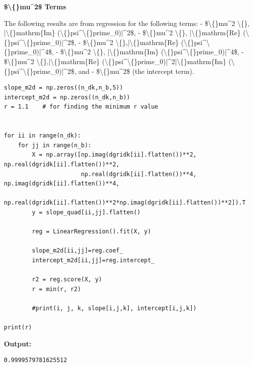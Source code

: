 \documentclass{article}
\begin{document}
\textbf{\$\textbackslash\{\}mu\textasciicircum{}2\$ Terms}

The following results are from regression for the following terms: 
 - \$\textbackslash\{\}mu\textasciicircum{}2 \textbackslash\{\}, |\textbackslash\{\}mathrm\{Im\} (\textbackslash\{\}psi\textasciicircum{}\textbackslash\{\}prime\_0)|\textasciicircum{}2\$, 
 - \$\textbackslash\{\}mu\textasciicircum{}2 \textbackslash\{\}, |\textbackslash\{\}mathrm\{Re\} (\textbackslash\{\}psi\textasciicircum{}\textbackslash\{\}prime\_0)|\textasciicircum{}2\$, 
 - \$\textbackslash\{\}mu\textasciicircum{}2 \textbackslash\{\},|\textbackslash\{\}mathrm\{Re\} (\textbackslash\{\}psi\textasciicircum{}\textbackslash\{\}prime\_0)|\textasciicircum{}4\$,
 - \$\textbackslash\{\}mu\textasciicircum{}2 \textbackslash\{\}, |\textbackslash\{\}mathrm\{Im\} (\textbackslash\{\}psi\textasciicircum{}\textbackslash\{\}prime\_0)|\textasciicircum{}4\$,
 - \$\textbackslash\{\}mu\textasciicircum{}2 \textbackslash\{\},|\textbackslash\{\}mathrm\{Re\} (\textbackslash\{\}psi\textasciicircum{}\textbackslash\{\}prime\_0)|\textasciicircum{}2|\textbackslash\{\}mathrm\{Im\} (\textbackslash\{\}psi\textasciicircum{}\textbackslash\{\}prime\_0)|\textasciicircum{}2\$, and
 - \$\textbackslash\{\}mu\textasciicircum{}2\$ (the intercept term).

\begin{lstlisting}
slope_m2d = np.zeros((n_dk,n_b,5))
intercept_m2d = np.zeros((n_dk,n_b))
r = 1.1    # for finding the minimum r value


for ii in range(n_dk):
    for jj in range(n_b):
        X = np.array([np.imag(dgridk[ii].flatten())**2, np.real(dgridk[ii].flatten())**2, 
                      np.real(dgridk[ii].flatten())**4, np.imag(dgridk[ii].flatten())**4, 
                      np.real(dgridk[ii].flatten())**2*np.imag(dgridk[ii].flatten())**2]).T
        y = slope_quad[ii,jj].flatten()

        reg = LinearRegression().fit(X, y)

        slope_m2d[ii,jj]=reg.coef_
        intercept_m2d[ii,jj]=reg.intercept_

        r2 = reg.score(X, y)
        r = min(r, r2)

        #print(i, j, k, slope[i,j,k], intercept[i,j,k])

print(r)\end{lstlisting}

\textbf{Output:}\begin{verbatim}
0.9999579781625512

\end{verbatim}
\end{document}
